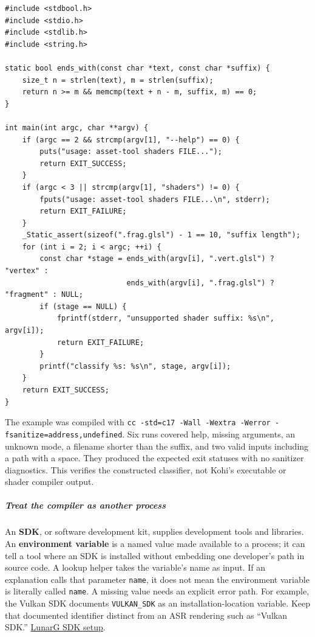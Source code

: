 \begin{verbatim}
#include <stdbool.h>
#include <stdio.h>
#include <stdlib.h>
#include <string.h>

static bool ends_with(const char *text, const char *suffix) {
    size_t n = strlen(text), m = strlen(suffix);
    return n >= m && memcmp(text + n - m, suffix, m) == 0;
}

int main(int argc, char **argv) {
    if (argc == 2 && strcmp(argv[1], "--help") == 0) {
        puts("usage: asset-tool shaders FILE...");
        return EXIT_SUCCESS;
    }
    if (argc < 3 || strcmp(argv[1], "shaders") != 0) {
        fputs("usage: asset-tool shaders FILE...\n", stderr);
        return EXIT_FAILURE;
    }
    _Static_assert(sizeof(".frag.glsl") - 1 == 10, "suffix length");
    for (int i = 2; i < argc; ++i) {
        const char *stage = ends_with(argv[i], ".vert.glsl") ? "vertex" :
                            ends_with(argv[i], ".frag.glsl") ? "fragment" : NULL;
        if (stage == NULL) {
            fprintf(stderr, "unsupported shader suffix: %s\n", argv[i]);
            return EXIT_FAILURE;
        }
        printf("classify %s: %s\n", stage, argv[i]);
    }
    return EXIT_SUCCESS;
}
\end{verbatim}

The example was compiled with \texttt{cc\ -std=c17\ -Wall\ -Wextra\ -Werror\ -fsanitize=address,undefined}. Six runs covered help, missing arguments, an unknown mode, a filename shorter than the suffix, and two valid inputs including a path with a space. They produced the expected exit statuses with no sanitizer diagnostics. This verifies the constructed classifier, not Kohi's executable or shader compiler output.

\subparagraph{Treat the compiler as another process}\label{treat-the-compiler-as-another-process}

An \textbf{SDK}, or software development kit, supplies development tools and libraries. An \textbf{environment variable} is a named value made available to a process; it can tell a tool where an SDK is installed without embedding one developer's path in source code. A lookup helper takes the variable's name as input. If an explanation calls that parameter \texttt{name}, it does not mean the environment variable is literally called \texttt{name}. A missing value needs an explicit error path. For example, the Vulkan SDK documents \texttt{VULKAN\_SDK} as an installation-location variable. Keep that documented identifier distinct from an ASR rendering such as ``Vulkan SDK.'' \href{https://vulkan.lunarg.com/doc/view/latest/linux/getting_started.html}{LunarG SDK setup}.

